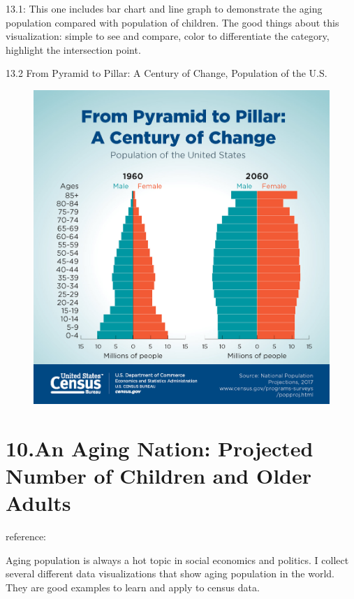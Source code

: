 \documentclass[]{book}
\theoremstyle{definition}
\theoremstyle{definition}
\theoremstyle{definition}
\theoremstyle{remark}
\begin{document}
13.1: This one includes bar chart and line graph to demonstrate the
aging population compared with population of children. The good things
about this visualization: simple to see and compare, color to
differentiate the category, highlight the intersection point.

13.2 From Pyramid to Pillar: A Century of Change, Population of the U.S.
\citep{population_pyramid}

\begin{figure}
\centering
\includegraphics{images/Pyramid.jpg}
\caption{}
\end{figure}

\section{10.An Aging Nation: Projected Number of Children and Older
Adults}\label{an-aging-nation-projected-number-of-children-and-older-adults-1}

reference:\citep{pyramid}

Aging population is always a hot topic in social economics and politics.
I collect several different data visualizations that show aging
population in the world. They are good examples to learn and apply to
census data.
\end{document}
